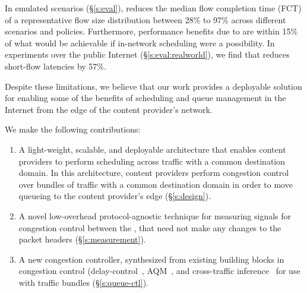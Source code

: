 In emulated scenarios (\S\ref{s:eval}), \name reduces the median flow completion time (FCT) of a representative flow size distribution between 28\% to 97\% across different scenarios and policies. Furthermore, performance benefits due to \name are within 15\% of what would be achievable if in-network scheduling were a possibility. 
In experiments over the public Internet (\S\ref{s:eval:realworld}), we find that \name reduces short-flow latencies by 57\%.


Despite these limitations, we believe that our work provides a deployable solution for enabling some of the benefits of scheduling and queue management in the Internet from the edge of the content provider's network.
 \fi
 
We make the following contributions:
\begin{enumerate}
    \item A light-weight, scalable, and deployable architecture that enables content providers to perform scheduling across traffic with a common destination domain. In this architecture, content providers perform congestion control over bundles of traffic with a common destination domain in order to move queueing to the content provider's edge (\S\ref{s:design}).
     \item A novel low-overhead protocol-agnostic technique for measuring signals for congestion control between the \pair, that need not make any changes to the packet headers (\S\ref{s:measurement}).
     \item A new congestion controller, synthesized from existing building blocks in congestion control (delay-control~\cite{copa}, AQM~\cite{pie}, and cross-traffic inference~\cite{nimbus} for use with traffic bundles (\S\ref{s:queue-ctl}).
\end{enumerate}
\fi
